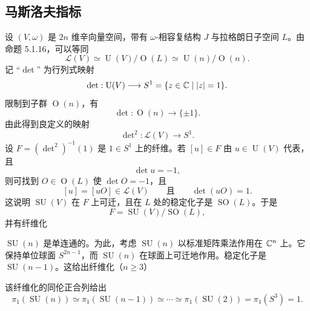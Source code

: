 
\subsection{马斯洛夫指标}

设 $(V,\omega)$ 是 $2n$ 维辛向量空间，带有 $\omega$-相容复结构 $J$ 与拉格朗日子空间 $L$。由命题 5.1.16，可以等同
\[
\mathcal{L}(V)\simeq\operatorname{U}(V)/\operatorname{O}(L)\simeq\operatorname{U}(n)/\operatorname{O}(n).
\]
记 “$\det$” 为行列式映射
\[
\det:\operatorname{U}(V)\longrightarrow S^1=\{z\in\mathbb{C}\mid |z|=1\}.
\]
限制到子群 $\operatorname{O}(n)$，有
\[
\det:\operatorname{O}(n)\longrightarrow\{\pm1\}.
\]
由此得到良定义的映射
\[
\det\nolimits^2:\mathcal{L}(V)\longrightarrow S^1.
\]
设 $F=(\det^2)^{-1}(1)$ 是 $1\in S^1$ 上的纤维。若 $[u]\in F$ 由 $u\in\operatorname{U}(V)$ 代表，且
\[
\det u=-1,
\]
则可找到 $O\in\operatorname{O}(L)$ 使 $\det O=-1$，且
\[
[u]=[uO]\in\mathcal{L}(V)\qquad\text{且}\qquad \det(uO)=1.
\]
这说明 $\operatorname{SU}(V)$ 在 $F$ 上可迁，且在 $L$ 处的稳定化子是 $\operatorname{SO}(L)$。于是
\[
F=\operatorname{SU}(V)/\operatorname{SO}(L),
\]
并有纤维化
\begin{center}
\end{center}

$\operatorname{SU}(n)$ 是单连通的。为此，考虑 $\operatorname{SU}(n)$ 以标准矩阵乘法作用在 $\mathbb{C}^n$ 上。它保持单位球面 $S^{2n-1}$，而 $\operatorname{SU}(n)$ 在球面上可迁地作用。稳定化子是 $\operatorname{SU}(n-1)$。这给出纤维化（$n\ge3$）
\begin{center}
\end{center}
该纤维化的同伦正合列给出
\[
\pi_1(\operatorname{SU}(n))\simeq\pi_1(\operatorname{SU}(n-1))\simeq\cdots\simeq\pi_1(\operatorname{SU}(2))=\pi_1(S^3)=1.
\]

